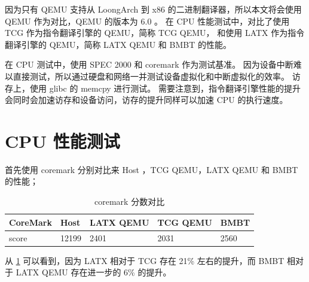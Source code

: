 因为只有 QEMU 支持从 LoongArch 到 x86 的二进制翻译器，所以本文将会使用 QEMU 作为对比，QEMU 的版本为 6.0 。
在 CPU 性能测试中，对比了使用 TCG 作为指令翻译引擎的 QEMU，简称 TCG QEMU， 和使用 LATX 作为指令翻译引擎的 QEMU，简称 LATX QEMU 和 BMBT 的性能。

在 CPU 测试中，使用 SPEC 2000 和 coremark 作为测试基准。
因为设备中断难以直接测试，所以通过硬盘和网络一并测试设备虚拟化和中断虚拟化的效率。
访存上，使用 glibc 的 memcpy 进行测试。
需要注意到，指令翻译引擎性能的提升会同时会加速访存和设备访问，访存的提升同样可以加速 CPU 的执行速度。

\section{CPU 性能测试}

首先使用 coremark 分别对比来 Host ，TCG QEMU，LATX QEMU 和 BMBT 的性能；
\begin{table}[!ht]
	\centering
	\caption{coremark 分数对比}
	\begin{tabular}{|l|l|l|l|l|}
		\hline
		CoreMark & Host  & LATX QEMU & TCG QEMU & BMBT \\ \hline
		score    & 12199 & 2401      & 2031     & 2560 \\ \hline
	\end{tabular}
	\label{table:spec2000_latx_qemu_float}
\end{table}

从 \ref{table:spec2000_latx_qemu_float} 可以看到，因为 LATX 相对于 TCG 存在 21\%
左右的提升，而 BMBT 相对于 LATX QEMU 存在进一步的 6\% 的提升。

